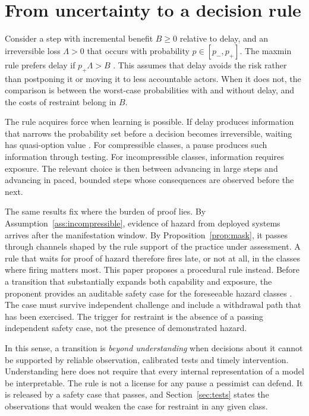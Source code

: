 \documentclass[11pt]{article}
\theoremstyle{plain}
\theoremstyle{definition}
\begin{document}
\section{From uncertainty to a decision rule}\label{sec:decision}

Consider a step with incremental benefit $B\ge0$ relative to delay, and an irreversible loss $\Lambda>0$ that occurs with probability $p\in[p_-,p_+]$. The maxmin rule prefers delay if $p_+\Lambda>B$ \citep{gilboa1989}. This assumes that delay avoids the risk rather than postponing it or moving it to less accountable actors. When it does not, the comparison is between the worst-case probabilities with and without delay, and the costs of restraint belong in $B$.

The rule acquires force when learning is possible. If delay produces information that narrows the probability set before a decision becomes irreversible, waiting has quasi-option value \citep{arrowfisher1974,henry1974,gollier2000}. For compressible classes, a pause produces such information through testing. For incompressible classes, information requires exposure. The relevant choice is then between advancing in large steps and advancing in paced, bounded steps whose consequences are observed before the next.

The same results fix where the burden of proof lies. By Assumption~\ref{ass:incompressible}, evidence of hazard from deployed systems arrives after the manifestation window. By Proposition~\ref{prop:mask}, it passes through channels shaped by the rule support of the practice under assessment. A rule that waits for proof of hazard therefore fires late, or not at all, in the classes where firing matters most. This paper proposes a procedural rule instead. Before a transition that substantially expands both capability and exposure, the proponent provides an auditable safety case for the foreseeable hazard classes \citep{clymer2024,buhl2024}. The case must survive independent challenge and include a withdrawal path that has been exercised. The trigger for restraint is the absence of a passing independent safety case, not the presence of demonstrated hazard.

In this sense, a transition is \emph{beyond understanding} when decisions about it cannot be supported by reliable observation, calibrated tests and timely intervention. Understanding here does not require that every internal representation of a model be interpretable. The rule is not a license for any pause a pessimist can defend. It is released by a safety case that passes, and Section~\ref{sec:tests} states the observations that would weaken the case for restraint in any given class.
\end{document}
